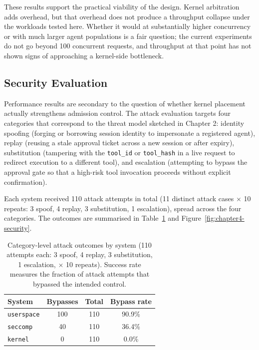 These results support the practical viability of the design. Kernel arbitration adds overhead, but that overhead does not produce a throughput collapse under the workloads tested here. Whether it would at substantially higher concurrency or with much larger agent populations is a fair question; the current experiments do not go beyond 100 concurrent requests, and throughput at that point has not shown signs of approaching a kernel-side bottleneck.


\subsection{Security Evaluation}

Performance results are secondary to the question of whether kernel placement actually strengthens admission control. The attack evaluation targets four categories that correspond to the threat model sketched in Chapter 2: identity spoofing (forging or borrowing session identity to impersonate a registered agent), replay (reusing a stale approval ticket across a new session or after expiry), substitution (tampering with the \texttt{tool\_id} or \texttt{tool\_hash} in a live request to redirect execution to a different tool), and escalation (attempting to bypass the approval gate so that a high-risk tool invocation proceeds without explicit confirmation).

Each system received 110 attack attempts in total (11 distinct attack cases $\times$ 10 repeats: 3 spoof, 4 replay, 3 substitution, 1 escalation), spread across the four categories. The outcomes are summarised in Table~\ref{tab:attacks} and Figure~\ref{fig:chapter4-security}.

\begin{table}[t]
\centering
\caption{Category-level attack outcomes by system (110 attempts each: 3 spoof, 4 replay, 3 substitution, 1 escalation, $\times$ 10 repeats). Success rate measures the fraction of attack attempts that bypassed the intended control.}
\label{tab:attacks}
\begin{tabular}{lccc}
\toprule
System & Bypasses & Total & Bypass rate \\
\midrule
\texttt{userspace} & 100 & 110 & 90.9\% \\
\texttt{seccomp}   &  40 & 110 & 36.4\% \\
\texttt{kernel}    &   0 & 110 &  0.0\% \\
\bottomrule
\end{tabular}
\end{table}

